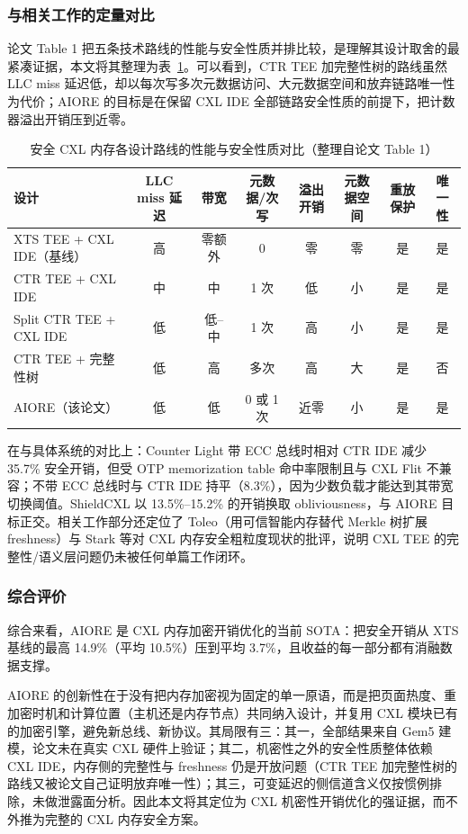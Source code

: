 \documentclass[11pt]{ctexart}
\begin{document}
\subsubsection{与相关工作的定量对比}
论文 Table 1 把五条技术路线的性能与安全性质并排比较，是理解其设计取舍的最紧凑证据，本文将其整理为表~\ref{tab:aiore-cmp}。可以看到，CTR TEE 加完整性树的路线虽然 LLC miss 延迟低，却以每次写多次元数据访问、大元数据空间和放弃链路唯一性为代价；AIORE 的目标是在保留 CXL IDE 全部链路安全性质的前提下，把计数器溢出开销压到近零。\par
\begin{table}[htbp]
\centering
\caption{安全 CXL 内存各设计路线的性能与安全性质对比（整理自论文 Table 1）}
\label{tab:aiore-cmp}
\footnotesize
\begin{tabular}{@{}lccccccc@{}}
\toprule
设计 & LLC miss 延迟 & 带宽 & 元数据/次写 & 溢出开销 & 元数据空间 & 重放保护 & 唯一性 \\
\midrule
XTS TEE + CXL IDE（基线） & 高 & 零额外 & 0 & 零 & 零 & 是 & 是 \\
CTR TEE + CXL IDE & 中 & 中 & 1 次 & 低 & 小 & 是 & 是 \\
Split CTR TEE + CXL IDE & 低 & 低--中 & 1 次 & 高 & 小 & 是 & 是 \\
CTR TEE + 完整性树 & 低 & 高 & 多次 & 高 & 大 & 是 & 否 \\
AIORE（该论文） & 低 & 低 & 0 或 1 次 & 近零 & 小 & 是 & 是 \\
\bottomrule
\end{tabular}
\end{table}
在与具体系统的对比上：Counter Light 带 ECC 总线时相对 CTR IDE 减少 35.7\% 安全开销，但受 OTP memorization table 命中率限制且与 CXL Flit 不兼容；不带 ECC 总线时与 CTR IDE 持平（8.3\%），因为少数负载才能达到其带宽切换阈值。ShieldCXL 以 13.5\%--15.2\% 的开销换取 obliviousness，与 AIORE 目标正交。相关工作部分还定位了 Toleo（用可信智能内存替代 Merkle 树扩展 freshness）与 Stark 等对 CXL 内存安全粗粒度现状的批评，说明 CXL TEE 的完整性/语义层问题仍未被任何单篇工作闭环。\par
\subsubsection{综合评价}
综合来看，AIORE 是 CXL 内存加密开销优化的当前 SOTA：把安全开销从 XTS 基线的最高 14.9\%（平均 10.5\%）压到平均 3.7\%，且收益的每一部分都有消融数据支撑。\par
AIORE 的创新性在于没有把内存加密视为固定的单一原语，而是把页面热度、重加密时机和计算位置（主机还是内存节点）共同纳入设计，并复用 CXL 模块已有的加密引擎，避免新总线、新协议。其局限有三：其一，全部结果来自 Gem5 建模，论文未在真实 CXL 硬件上验证；其二，机密性之外的安全性质整体依赖 CXL IDE，内存侧的完整性与 freshness 仍是开放问题（CTR TEE 加完整性树的路线又被论文自己证明放弃唯一性）；其三，可变延迟的侧信道含义仅按惯例排除，未做泄露面分析。因此本文将其定位为 CXL 机密性开销优化的强证据，而不外推为完整的 CXL 内存安全方案。\par
\end{document}
